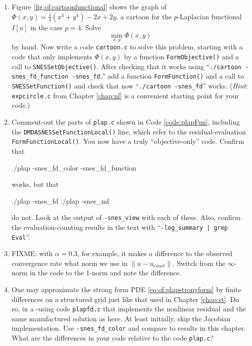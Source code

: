 \begin{enumerate}
\item Figure \ref{fig:of:cartoonfunctional} shows the graph of $\Phi(x,y)=\tfrac{1}{4}(x^4+y^4) - 2x + 2y$, a cartoon for the $p$-Laplacian functional $I[u]$ in the case $p=4$.  Solve
    $$\min_{x,y} \Phi(x,y)$$
by hand.  Now write a \PETSc code \texttt{cartoon.c} to solve this problem, starting with a code that only implements $\Phi(x,y)$ by a function \texttt{FormObjective()} and a call to \texttt{SNESSetObjective()}.  After checking that it works using ``\texttt{./cartoon -snes\_fd\_function -snes\_fd},'' add a function \texttt{FormFunction()} and a call to \texttt{SNESSetFunction()} and check that now ``\texttt{./cartoon -snes\_fd}'' works.  (\emph{Hint}:  \texttt{expcircle.c} from Chapter \ref{chap:nl} is a convenient starting point for your code.)

\item \label{exer:of:commentoutresidual}  Comment-out the parts of \texttt{plap.c} shown in Code \ref{code:plapFun}, including the \texttt{DMDASNESSetFunctionLocal()} line, which refer to the residual-evaluation \texttt{FormFunctionLocal()}.  You now have a truly ``objective-only'' code.  Confirm that
\begin{cline}
./plap -snes_fd_color -snes_fd_function
\end{cline}
works, but that
\begin{cline}
./plap -snes_fd
./plap -snes_mf
\end{cline}
do not.  Look at the output of \texttt{-snes\_view} with each of these.  Also, confirm the evaluation-counting results in the text with ``\texttt{-log\_summary | grep Eval}''.

\item FIXME: with $\alpha=0.3$, for example, it makes a difference to the observed convergence rate what norm we use in $\|u-u_{exact}\|$.  Switch from the $\infty$-norm in the code to the 1-norm and note the difference.

\item One may approximate the strong form PDE \eqref{eq:of:plapstrongform} by finite differences on a structured grid just like that used in Chapter \ref{chap:st}.  Do so, in a \pSNES-using code \texttt{plapfd.c} that implements the nonlinear residual and the same manufactured solution as here.  At least initially, skip the Jacobian implementation.  Use \texttt{-snes\_fd\_color} and compare to results in this chapter.  What are the differences in your code relative to the code \texttt{plap.c}?


\end{enumerate}
